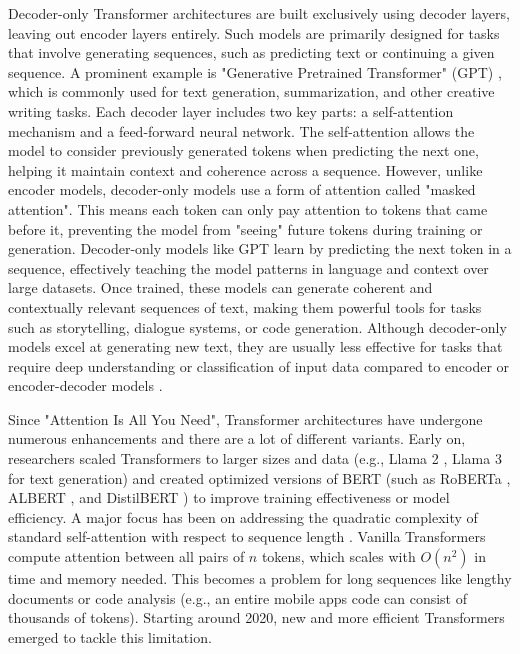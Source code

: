 Decoder-only Transformer architectures are built exclusively using decoder layers, 
leaving out encoder layers entirely. 
Such models are primarily designed for tasks that involve generating sequences, 
such as predicting text or continuing a given sequence. 
A prominent example is "Generative Pretrained Transformer" (GPT) \cite{gpt1, gpt2, gpt3, gpt4}, 
which is commonly used for text generation, summarization, and other creative writing tasks.
Each decoder layer includes two key parts: 
a self-attention mechanism and a feed-forward neural network. 
The self-attention allows the model to consider previously generated tokens when predicting the next one, 
helping it maintain context and coherence across a sequence. 
However, unlike encoder models, decoder-only models use a form of attention called "masked attention". 
This means each token can only pay attention to tokens that came before it, 
preventing the model from "seeing" future tokens during training or generation.
Decoder-only models like GPT learn by predicting the next token in a sequence, 
effectively teaching the model patterns in language and context over large datasets. 
Once trained, these models can generate coherent and contextually relevant sequences of text, 
making them powerful tools for tasks such as storytelling, dialogue systems, or code generation. 
Although decoder-only models excel at generating new text, 
they are usually less effective for tasks that require deep understanding or classification of input 
data compared to encoder or encoder-decoder models \cite{encoder_vs_decoder}.

Since "Attention Is All You Need", Transformer architectures have undergone numerous enhancements 
and there are a lot of different variants. 
Early on, researchers scaled Transformers to larger sizes and data 
(e.g., Llama 2 \cite{llama2}, Llama 3 \cite{llama3} for text generation) and created optimized versions of BERT 
(such as RoBERTa \cite{roberta}, ALBERT \cite{albert}, and DistilBERT \cite{distilbert}) 
to improve training effectiveness or model efficiency. 
A major focus has been on addressing the quadratic complexity of standard self-attention with respect 
to sequence length \cite{nystromformer}. 
Vanilla Transformers compute attention between all pairs of $n$ tokens, 
which scales with $O(n^2)$ in time and memory needed. 
This becomes a problem for long sequences like lengthy documents or code analysis 
(e.g., an entire mobile apps code can consist of thousands of tokens). 
Starting around 2020, new and more efficient Transformers emerged to tackle this limitation.


